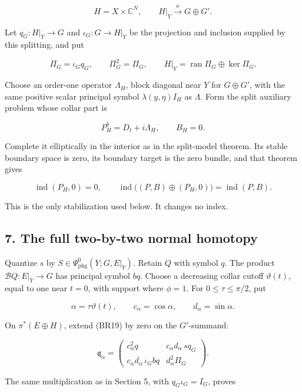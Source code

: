 \documentclass[
  11pt,
]{article}
\begin{document}
\[
 H=X\times\mathbb C^N,\qquad
 H|_Y\xrightarrow{\ \kappa\ }G\oplus G'.
 \tag{BR23}
\]

Let \(q_G:H|_Y\to G\) and \(\iota_G:G\to H|_Y\) be the projection and
inclusion supplied by this splitting, and put

\[
 \Pi_G=\iota_Gq_G,\qquad
 \Pi_G^2=\Pi_G,\qquad
 H|_Y=\operatorname{ran}\Pi_G\oplus\ker\Pi_G .
 \tag{BR24}
\]

Choose an order-one operator \(\Lambda_H\), block diagonal near \(Y\)
for \(G\oplus G'\), with the same positive scalar principal symbol
\(\lambda(y,\eta)I_H\) as \(\Lambda\). Form the split auxiliary problem
whose collar part is

\[
 P_H^b=D_t+i\Lambda_H,\qquad B_H=0 .
 \tag{BR25}
\]

Complete it elliptically in the interior as in the split-model theorem.
Its stable boundary space is zero, its boundary target is the zero
bundle, and that theorem gives

\[
 \operatorname{ind}(P_H,0)=0,\qquad
 \operatorname{ind}\bigl((P,B)\oplus(P_H,0)\bigr)
 =\operatorname{ind}(P,B).
 \tag{BR26}
\]

This is the only stabilization used below. It changes no index.

\subsection{7. The full two-by-two normal
homotopy}\label{the-full-two-by-two-normal-homotopy}

Quantize \(s\) by \(S\in\Psi_{\mathrm{phg}}^0(Y;G,E|_Y)\). Retain \(Q\)
with symbol \(q\). The product \(\mathcal BQ:E|_Y\to G\) has principal
symbol \(bq\). Choose a decreasing collar cutoff \(\vartheta(t)\), equal
to one near \(t=0\), with support where \(\phi=1\). For
\(0\leq\tau\leq\pi/2\), put

\[
 \alpha=\tau\vartheta(t),\qquad
 c_\alpha=\cos\alpha,\qquad d_\alpha=\sin\alpha .
 \tag{BR27}
\]

On \(\pi^*(E\oplus H)\), extend (BR19) by zero on the \(G'\)-summand:

\[
 \mathfrak q_\alpha=
 \begin{pmatrix}
 c_\alpha^2q&
 c_\alpha d_\alpha\,s q_G\\
 c_\alpha d_\alpha\,\iota_Gbq&
 d_\alpha^2\Pi_G
 \end{pmatrix}.
 \tag{BR28}
\]

The same multiplication as in Section 5, with \(q_G\iota_G=I_G\), proves
\end{document}
